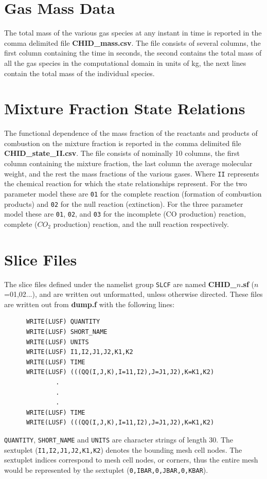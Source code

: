 \documentclass[11pt]{book}
\newcommand{\ct}{\tt\small}
\begin{document}
\section{Gas Mass Data}

The total mass of the various gas species at any instant in time
is reported in the comma delimited
file {\bf CHID\_mass.csv}. The file consists of several columns,
the first column containing the time in seconds, the second contains the
total mass of all the gas species in the computational domain in units of kg,
the next lines contain the total mass of the individual species.

\section{Mixture Fraction State Relations}

The functional dependence of the mass fraction of the reactants and
products of combustion on the mixture fraction is
reported in the comma delimited
file {\bf CHID\_state\_II.csv}. The file consists of nominally 10 columns,
the first column containing the mixture fraction, the last column the average molecular weight, and
the rest the mass fractions of the various gases.  Where {\ct II} represents the chemical reaction for
which the state relationships represent.  For the two parameter model these are {\ct 01}
for the complete reaction (formation of combustion products) and {\ct 02} for the null reaction
(extinction).  For the three parameter model these are {\ct 01}, {\ct 02}, and {\ct 03} for the
incomplete (CO production) reaction, complete ($CO_2$ production) reaction, and the null
reaction respectively.

\section{Slice Files}
\label{out:SLCF}
The slice files defined under the namelist group {\ct SLCF} are
named {\bf CHID\_$n$.sf} ($n$=01,02...),
and are written out unformatted, unless otherwise directed.
These files are written out from {\bf dump.f} with the following lines:

\footnotesize
\begin{verbatim}
      WRITE(LUSF) QUANTITY
      WRITE(LUSF) SHORT_NAME
      WRITE(LUSF) UNITS
      WRITE(LUSF) I1,I2,J1,J2,K1,K2
      WRITE(LUSF) TIME
      WRITE(LUSF) (((QQ(I,J,K),I=11,I2),J=J1,J2),K=K1,K2)
              .
              .
              .
      WRITE(LUSF) TIME
      WRITE(LUSF) (((QQ(I,J,K),I=11,I2),J=J1,J2),K=K1,K2)
\end{verbatim}
\normalsize
{\ct QUANTITY}, {\ct SHORT\_NAME} and {\ct UNITS} are
character strings of length 30.
The sextuplet ({\ct I1,I2,J1,J2,K1,K2}) denotes the bounding mesh cell
nodes. The sextuplet indices correspond to mesh cell
nodes, or corners, thus the entire mesh would be represented by the
sextuplet ({\ct 0,IBAR,0,JBAR,0,KBAR}).
\end{document}
